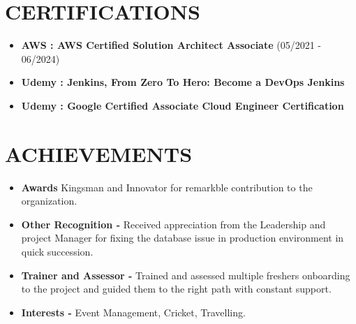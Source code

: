 \documentclass[letterpaper,11pt]{article}
\begin{document}
\section{CERTIFICATIONS}
 \begin{itemize}
    \item \textbf{AWS : AWS Certified Solution Architect Associate} {(05/2021 - 06/2024)}\vspace{2pt} \\
    \item \textbf{Udemy : Jenkins, From Zero To Hero: Become a DevOps Jenkins} \\
    \item \textbf{Udemy : Google Certified Associate Cloud Engineer
Certification } \\
 \end{itemize}
 
\section{ACHIEVEMENTS}
 \begin{itemize}
    \item \textbf{Awards} {Kingsman and Innovator for remarkble contribution to the organization.} \vspace{2pt} \\
    \item \textbf{Other Recognition -} {Received appreciation from the Leadership and project Manager for fixing the database  issue in production environment in quick succession.} \vspace{2pt} \\
    \item \textbf{Trainer and Assessor -} {Trained and assessed multiple freshers onboarding to the project and guided them to the right path with constant support.} \vspace{2pt} \\
    \item \textbf{Interests -} {Event Management, Cricket, Travelling.} \vspace{2pt} \\
 \end{itemize}
\end{document}
